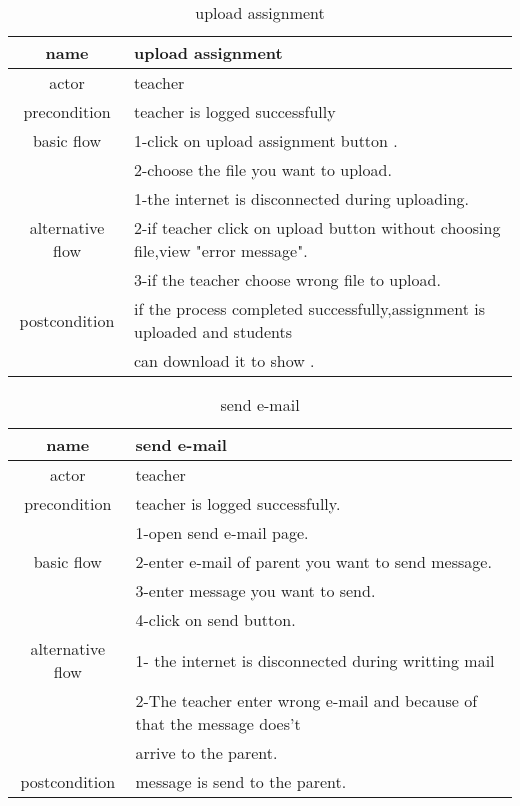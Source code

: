 \documentclass{article}
\begin{document}
    \begin{table}
    	\centering
    	\label{upload assignment }
    	\caption{upload assignment }
    	\begin{tabular}{|c|l|}
    		\hline
    		name & upload assignment\\ 
    		\hline
    		actor & teacher\\
    		\hline
    		precondition & teacher is logged successfully\\
    		\hline
    		basic flow & 1-click on upload assignment button .\\
    		&2-choose the file you want to upload.\\
    		\hline
    	     & 1-the internet is disconnected during uploading.\\
    		alternative flow	& 2-if teacher click on upload button without choosing file,view "error message".\\
    		&3-if the teacher choose wrong file to upload.\\
    		\hline
    		postcondition & if the process completed successfully,assignment is uploaded and students\\& can download it to show .\\
    		\hline
    	\end{tabular}
    \end{table}   
    
    \begin{table}[!h]
    	\centering
    	\label{send e-mail}
    	\caption{send e-mail}
    	\begin{tabular}{|c|l|}
    		\hline
	    	name & send e-mail\\
	    	\hline
	    	actor & teacher\\ 
	    	\hline
	    	precondition & teacher is logged successfully.\\
	    	\hline
	    	&1-open send e-mail page.\\
	    	basic flow & 2-enter e-mail of parent you want to send message.\\
	    	&3-enter message you want to send.\\
	    	&4-click on send button.\\
	    	\hline
	    	alternative flow &  1- the internet is disconnected during writting mail\\
	    	&2-The teacher enter wrong e-mail and because of that the message does't\\& arrive to the parent.\\
	    	\hline
	    	postcondition & message is send to the parent.\\
	    	\hline
    	\end{tabular}
    \end{table} 
    
\end{document}
